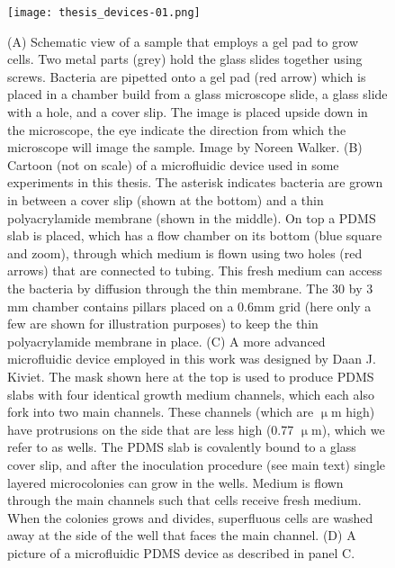 %
%

\begin{figure}
	\centering
	\texttt{[image: thesis\_devices-01.png]}
	\caption{ 
		(A) Schematic view of a sample that employs a gel pad to grow cells. Two metal parts (grey) hold the glass slides together using screws. Bacteria are pipetted onto a gel pad (red arrow) which is placed in a chamber build from a glass microscope slide, a glass slide with a hole, and a cover slip. The image is placed upside down in the microscope, the eye indicate the direction from which the microscope will image the sample. Image by Noreen Walker.
		(B) Cartoon (not on scale) of a microfluidic device used in some experiments in this thesis. 
		The asterisk indicates bacteria are grown in between a cover slip (shown at the bottom) and a thin polyacrylamide membrane (shown in the middle).
		On top a PDMS slab is placed, which has a flow chamber on its bottom (blue square and zoom), through which medium is flown using two holes (red arrows) that are connected to tubing. 
		This fresh medium can access the bacteria by diffusion through the thin membrane. 
		The 30 by 3 mm chamber contains pillars placed on a 0.6mm grid (here only a few are shown for illustration purposes) to keep the thin polyacrylamide membrane in place. 
		(C) A more advanced microfluidic device employed in this work was designed by Daan J. Kiviet. 
		The mask shown here at the top is used to produce PDMS slabs with four identical growth medium channels, which each also fork into two main channels. 
		These channels (which are  $\upmu$m high) have protrusions on the side that are less high (0.77 $\upmu$m), which we refer to as wells.
		The PDMS slab is covalently bound to a glass cover slip, and after the inoculation procedure (see main text) single layered microcolonies can grow in the wells.
		Medium is flown through the main channels such that cells receive fresh medium. 
		When the colonies grows and divides, superfluous cells are washed away at the side of the well that faces the main channel.		
		(D) A picture of a microfluidic PDMS device as described in panel C.
	}
	\label{fig:mm:devices}
\end{figure}


